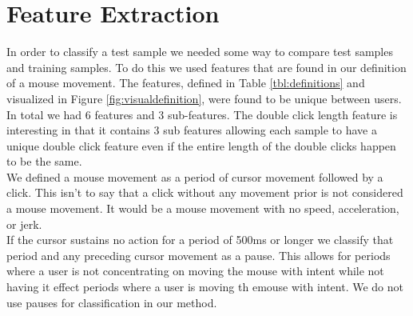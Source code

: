 \documentclass[conference]{IEEEtran}
\begin{document}
\bgroup
\def\arraystretch{1.5}
\egroup
{}


\section{Feature Extraction}
    In order to classify a test sample we needed some way to compare test samples and training samples. To do this we used features that are found in our definition of a mouse movement. The features, defined in Table \ref{tbl:definitions} and visualized in Figure \ref{fig:visualdefinition}, were found to be unique between users. In total we had 6 features and 3 sub-features. The double click length feature is interesting in that it contains 3 sub features allowing each sample to have a unique double click feature even if the entire length of the double clicks happen to be the same.\\
	We defined a mouse movement as a period of cursor movement followed by a click. This isn't to say that a click without any movement prior is not considered a mouse movement. It would be a mouse movement with no speed, acceleration, or jerk. \\
	If the cursor sustains no action for a period of 500ms or longer we classify that period and any preceding cursor movement as a pause. This allows for periods where a user is not concentrating on moving the mouse with intent while not having it effect periods where a user is moving th emouse with intent. We do not use pauses for classification in our method.
\end{document}
